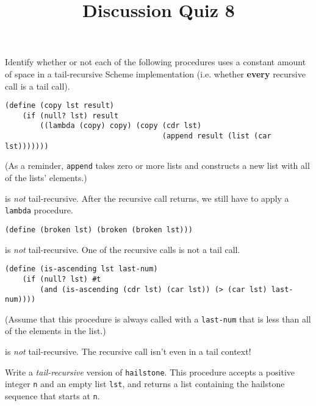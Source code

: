 \documentclass[twoside]{article}
\title{\sc Discussion Quiz 8 \solution{Solutions}}
\newcommand{\solution}[1]{{\color{red}#1}}
\begin{document}
\thispagestyle{empty}
\maketitle

\begin{enumerate}

Identify whether or not each of the following procedures uses a constant amount of space in a tail-recursive Scheme implementation (i.e. whether \textbf{every} recursive call is a tail call).

\begin{lstlisting}
(define (copy lst result)
    (if (null? lst) result
        ((lambda (copy) copy) (copy (cdr lst)
                                    (append result (list (car lst)))))))
\end{lstlisting}

(As a reminder, {\tt append} takes zero or more lists and constructs a new list with all of the lists' elements.)

\solution{{\tt copy} is \emph{not} tail-recursive. After the recursive call returns, we still have to apply a {\tt lambda} procedure.}
\newline

\begin{lstlisting}
(define (broken lst) (broken (broken lst)))
\end{lstlisting}

\solution{{\tt broken} is \emph{not} tail-recursive. One of the recursive calls is not a tail call.}
\newline

\begin{lstlisting}
(define (is-ascending lst last-num)
    (if (null? lst) #t
        (and (is-ascending (cdr lst) (car lst)) (> (car lst) last-num))))
\end{lstlisting}

(Assume that this procedure is always called with a {\tt last-num} that is less than all of the elements in the list.)

\solution{{\tt is-ascending} is \emph{not} tail-recursive. The recursive call isn't even in a tail context!}
\newline


Write a \emph{tail-recursive} version of {\tt hailstone}. This procedure accepts a positive integer {\tt n} and an empty list {\tt lst}, and returns a list containing the hailstone sequence that starts at {\tt n}.


\end{enumerate}
\end{document}
